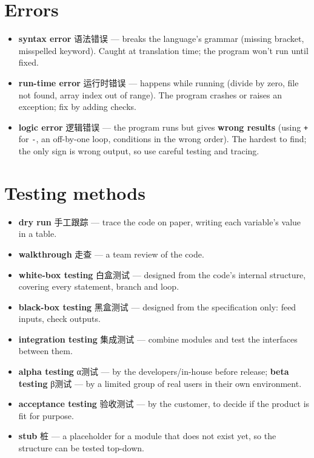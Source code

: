 \documentclass[11pt]{article}
\begin{document}
\section*{Errors}

\begin{itemize}
\item \textbf{syntax error} 语法错误 — breaks the language's grammar (missing bracket, misspelled keyword). Caught at translation time; the program won't run until fixed.

\item \textbf{run-time error} 运行时错误 — happens while running (divide by zero, file not found, array index out of range). The program crashes or raises an exception; fix by adding checks.

\item \textbf{logic error} 逻辑错误 — the program runs but gives \textbf{wrong results} (using \texttt{+} for \texttt{-}, an off-by-one loop, conditions in the wrong order). The hardest to find; the only sign is wrong output, so use careful testing and tracing.

\end{itemize}

\section*{Testing methods}

\begin{itemize}
\item \textbf{dry run} 手工跟踪 — trace the code on paper, writing each variable's value in a table.

\item \textbf{walkthrough} 走查 — a team review of the code.

\item \textbf{white-box testing} 白盒测试 — designed from the code's internal structure, covering every statement, branch and loop.

\item \textbf{black-box testing} 黑盒测试 — designed from the specification only: feed inputs, check outputs.

\item \textbf{integration testing} 集成测试 — combine modules and test the interfaces between them.

\item \textbf{alpha testing} α测试 — by the developers/in-house before release; \textbf{beta testing} β测试 — by a limited group of real users in their own environment.

\item \textbf{acceptance testing} 验收测试 — by the customer, to decide if the product is fit for purpose.

\item \textbf{stub} 桩 — a placeholder for a module that does not exist yet, so the structure can be tested top-down.

\end{itemize}
\end{document}
